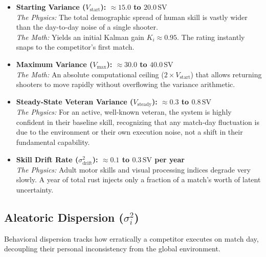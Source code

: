 \documentclass[12pt]{article}
\begin{document}
	\begin{itemize}
		\item \textbf{Starting Variance ($V_{\mathrm{start}}$): $\approx 15.0$ to $20.0\,\text{SV}$}\\
		\textit{The Physics:} The total demographic spread of human skill is vastly wider than the day-to-day noise of a single shooter.\\
		\textit{The Math:} Yields an initial Kalman gain $K_i \approx 0.95$. The rating instantly snaps to the competitor's first match.
		
		\item \textbf{Maximum Variance ($V_{\max}$): $\approx 30.0$ to $40.0\,\text{SV}$}\\
		\textit{The Math:} An absolute computational ceiling ($2 \times V_{\mathrm{start}}$) that allows returning shooters to move rapidly without overflowing the variance arithmetic.
		
		\item \textbf{Steady-State Veteran Variance ($V_{\mathrm{steady}}$): $\approx 0.3$ to $0.8\,\text{SV}$}\\
		\textit{The Physics:} For an active, well-known veteran, the system is highly confident in their baseline skill, recognizing that any match-day fluctuation is due to the environment or their own execution noise, not a shift in their fundamental capability.
		
		\item \textbf{Skill Drift Rate ($\sigma_{\mathrm{drift}}^2$): $\approx 0.1$ to $0.3\,\text{SV}$ per year}\\
		\textit{The Physics:} Adult motor skills and visual processing indices degrade very slowly. A year of total rust injects only a fraction of a match's worth of latent uncertainty.
	\end{itemize}
	
	\subsection{Aleatoric Dispersion ($\sigma_i^2$)}
	Behavioral dispersion tracks how erratically a competitor executes on match day, decoupling their personal inconsistency from the global environment.
	
\end{document}
